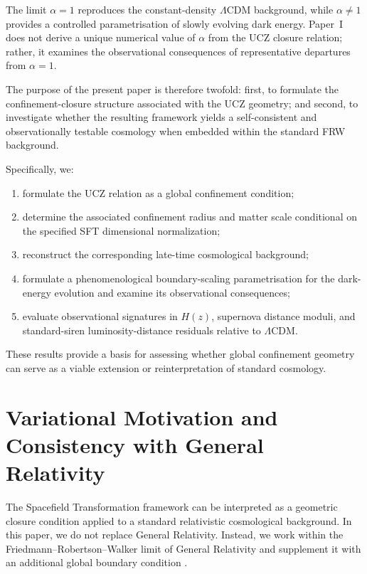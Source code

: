 \documentclass[12pt]{article}
\begin{document}
The limit $\alpha=1$ reproduces the constant-density $\Lambda$CDM
background, while $\alpha\neq1$ provides a controlled parametrisation
of slowly evolving dark energy. Paper~I does not derive a unique
numerical value of $\alpha$ from the UCZ closure relation; rather, it
examines the observational consequences of representative departures
from $\alpha=1$.

The purpose of the present paper is therefore twofold:
first, to formulate the confinement-closure structure associated with
the UCZ geometry; and second, to investigate whether the resulting
framework yields a self-consistent and observationally testable
cosmology when embedded within the standard FRW background.

Specifically, we:
\begin{enumerate}
\item formulate the UCZ relation as a global confinement condition;
\item determine the associated confinement radius and matter scale
conditional on the specified SFT dimensional normalization;
\item reconstruct the corresponding late-time cosmological background;
\item formulate a phenomenological boundary-scaling parametrisation for
the dark-energy evolution and examine its observational consequences;
\item evaluate observational signatures in $H(z)$, supernova distance
moduli, and standard-siren luminosity-distance residuals relative to
$\Lambda$CDM.
\end{enumerate}

These results provide a basis for assessing whether global confinement
geometry can serve as a viable extension or reinterpretation of standard
cosmology.

\section{Variational Motivation and Consistency with General Relativity}
\label{sec:variational}

The Spacefield Transformation framework can be interpreted as a geometric
closure condition applied to a standard relativistic cosmological background.
In this paper, we do not replace General Relativity. Instead, we work within
the Friedmann--Robertson--Walker limit of General Relativity and supplement it
with an additional global boundary condition \cite{Einstein1916,Carroll2004,Wald1984,Weinberg2008}.
\end{document}
